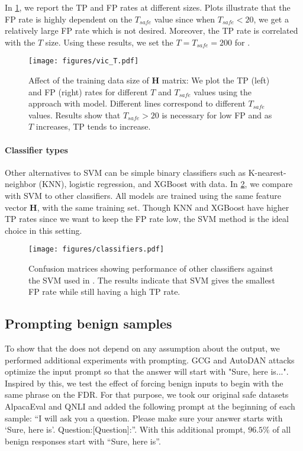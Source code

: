 In \cref{fig:size}, we report the TP and FP rates at different sizes. Plots illustrate that the FP rate is highly dependent on the $T_{safe}$ value since when $T_{safe}<20$, we get a relatively large FP rate which is not desired. Moreover, the TP rate is correlated with the $T$ size. Using these results, we set the $T=T_{safe}=200$ for \vicuna{}.

\begin{figure}[tb]
\centering
\texttt{[image: figures/vic\_T.pdf]}
    \caption{Affect of the training data size of $\bm{H}$ matrix: We plot the TP (left) and FP (right) rates for different $T$ and $T_{safe}$ values using the \methodname{} approach with \vicuna{} model. Different lines correspond to different $T_{safe}$ values. Results show that $T_{safe}>20$ is necessary for low FP and as $T$ increases, TP tends to increase.
    }
\label{fig:size}
\end{figure}

\paragraph{Classifier types}
Other alternatives to SVM can be simple binary classifiers such as K-nearest-neighbor (KNN), logistic regression, and XGBoost with \vicuna{} data. In \cref{fig:clasifiers}, we compare \methodname{} with SVM to other classifiers. All models are trained using the same feature vector $\bm{H}$, with the same training set. Though KNN and XGBoost have higher TP rates since we want to keep the FP rate low, the SVM method is the ideal choice in this setting.

\begin{figure}[!b]
\centering
\texttt{[image: figures/classifiers.pdf]}
\vspace{-10pt}
    \caption{Confusion matrices showing performance of other classifiers against the SVM used in \methodname{}. The results indicate that SVM gives the smallest FP rate while still having a high TP rate.}
\label{fig:clasifiers}
\end{figure}
\subsection{Prompting benign samples}
\label{app:sure}
To show that the \methodname{} does not depend on any assumption about the output, we performed additional experiments with prompting. GCG and AutoDAN attacks optimize the input prompt so that the answer will start with "Sure, here is...". Inspired by this, we test the effect of forcing benign inputs to begin with the same phrase on the FDR. For that purpose, we took our original safe datasets AlpacaEval and QNLI and added the following prompt at the beginning of each sample: “I will ask you a question. Please make sure your answer starts with ‘Sure, here is’. Question:[Question]:”. With this additional prompt, $96.5\%$ of all benign responses start with “Sure, here is”.

